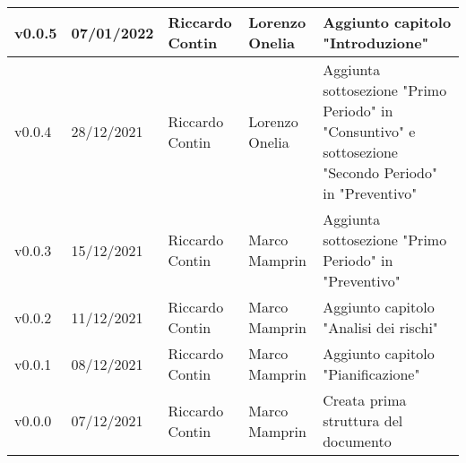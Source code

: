 {\begin{longtable}{|C{1.8cm}|C{2.1cm}|C{2cm}|C{2.4cm}|L{4.4cm}|}
  v0.0.5        & 07/01/2022    & Riccardo Contin   & Lorenzo Onelia                  & Aggiunto capitolo "Introduzione" \\ \hline
  v0.0.4        & 28/12/2021    & Riccardo Contin   & Lorenzo Onelia                  & Aggiunta sottosezione "Primo Periodo" in "Consuntivo" e sottosezione "Secondo Periodo" in "Preventivo" \\ \hline
  v0.0.3        & 15/12/2021    & Riccardo Contin   & Marco Mamprin                   & Aggiunta sottosezione "Primo Periodo" in "Preventivo" \\ \hline
  v0.0.2        & 11/12/2021    & Riccardo Contin   & Marco Mamprin                   & Aggiunto capitolo "Analisi dei rischi" \\ \hline
  v0.0.1        & 08/12/2021    & Riccardo Contin   & Marco Mamprin                   & Aggiunto capitolo "Pianificazione" \\ \hline
  v0.0.0        & 07/12/2021    & Riccardo Contin   & Marco Mamprin                   & Creata prima struttura del documento \\ \hline
\end{longtable}}

\renewcommand\arraystretch{1}
